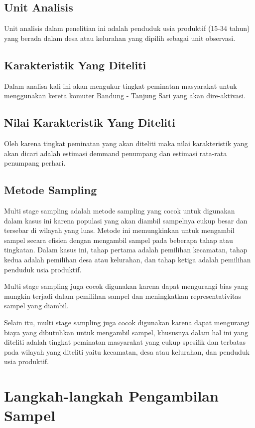 \documentclass{article}
\begin{document}
\subsection{Unit Analisis}
Unit analisis dalam penelitian ini adalah penduduk usia produktif (15-34 tahun) yang berada dalam desa atau kelurahan yang dipilih sebagai unit observasi.

\subsection{Karakteristik Yang Diteliti}
Dalam analisa kali ini akan mengukur tingkat peminatan masyarakat untuk menggunakan kereta komuter Bandung - Tanjung Sari yang akan dire-aktivasi.

\subsection{Nilai Karakteristik Yang Diteliti}
Oleh karena tingkat peminatan yang akan diteliti maka nilai karakteristik yang akan dicari adalah estimasi demmand penumpang dan estimasi rata-rata penumpang perhari.

\subsection{Metode Sampling}

Multi stage sampling adalah metode sampling yang cocok untuk digunakan dalam kasus ini karena populasi yang akan diambil sampelnya cukup besar dan tersebar di wilayah yang luas. Metode ini memungkinkan untuk mengambil sampel secara efisien dengan mengambil sampel pada beberapa tahap atau tingkatan. Dalam kasus ini, tahap pertama adalah pemilihan kecamatan, tahap kedua adalah pemilihan desa atau kelurahan, dan tahap ketiga adalah pemilihan penduduk usia produktif. \par

Multi stage sampling juga cocok digunakan karena dapat mengurangi bias yang mungkin terjadi dalam pemilihan sampel dan meningkatkan representativitas sampel yang diambil.

Selain itu, multi stage sampling juga cocok digunakan karena dapat mengurangi biaya yang dibutuhkan untuk mengambil sampel, khususnya dalam hal ini yang diteliti adalah tingkat peminatan masyarakat yang cukup spesifik dan terbatas pada wilayah yang diteliti yaitu kecamatan, desa atau kelurahan, dan penduduk usia produktif.

\section{Langkah-langkah Pengambilan Sampel}
\end{document}
